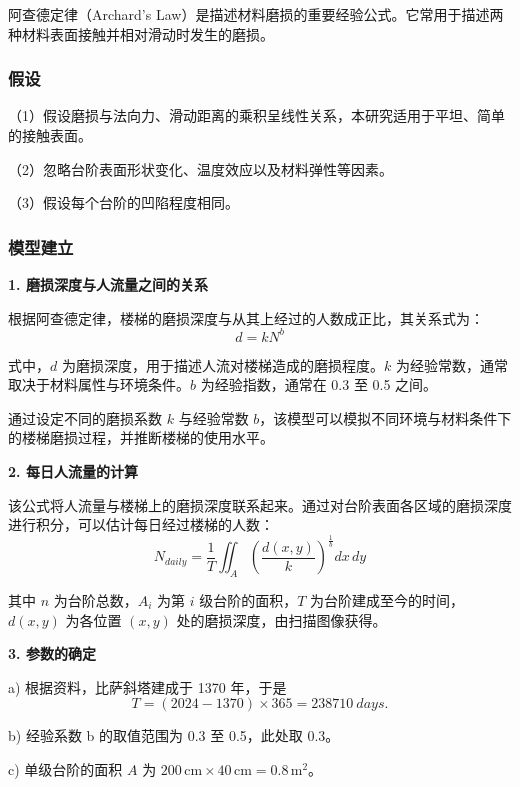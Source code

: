 \documentclass[11pt,a4paper]{ctexart}
\begin{document}
阿查德定律（Archard's Law）是描述材料磨损的重要经验公式\cite{ref3}。它常用于描述两种材料表面接触并相对滑动时发生的磨损。

\subsubsection{假设}

（1）假设磨损与法向力、滑动距离的乘积呈线性关系，本研究适用于平坦、简单的接触表面。

（2）忽略台阶表面形状变化、温度效应以及材料弹性等因素。

（3）假设每个台阶的凹陷程度相同。

\subsubsection{模型建立}

\noindent\textbf{1. 磨损深度与人流量之间的关系}

根据阿查德定律，楼梯的磨损深度与从其上经过的人数成正比，其关系式为：
\begin{equation}
d=kN^b\tag{2}
\end{equation}

式中，$d$ 为磨损深度，用于描述人流对楼梯造成的磨损程度。$k$ 为经验常数，通常取决于材料属性与环境条件。$b$ 为经验指数，通常在 0.3 至 0.5 之间。

通过设定不同的磨损系数 $k$ 与经验常数 $b$，该模型可以模拟不同环境与材料条件下的楼梯磨损过程，并推断楼梯的使用水平。

\noindent\textbf{2. 每日人流量的计算}

该公式将人流量与楼梯上的磨损深度联系起来。通过对台阶表面各区域的磨损深度进行积分，可以估计每日经过楼梯的人数：
\begin{equation}
N_{daily}=\frac{1}{T}\iint_A\left(\frac{d(x,y)}{k}\right)^{\frac{1}{b}}dx\,dy\tag{3}
\end{equation}

其中 $n$ 为台阶总数，$A_i$ 为第 $i$ 级台阶的面积，$T$ 为台阶建成至今的时间，$d(x,y)$ 为各位置 $(x,y)$ 处的磨损深度，由扫描图像获得。

\noindent\textbf{3. 参数的确定}

a) 根据资料，比萨斜塔建成于 1370 年\cite{ref4}，于是
\[
T=(2024-1370)\times 365=238710\ \textit{days}.
\]

b) 经验系数 b 的取值范围为 0.3 至 0.5，此处取 0.3。

c) 单级台阶的面积 $A$ 为 $200\,\mathrm{cm}\times 40\,\mathrm{cm}=0.8\,\mathrm{m}^2$。
\end{document}
